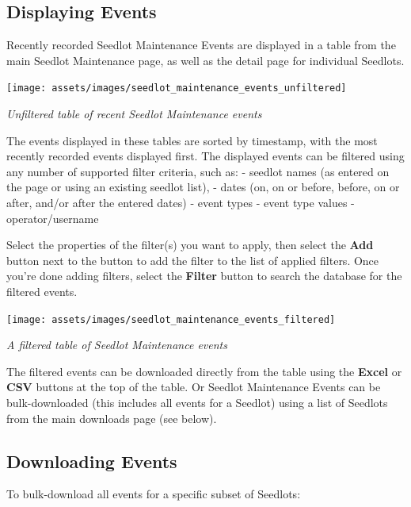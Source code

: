 \documentclass[
  12pt,
]{book}
\begin{document}
\hypertarget{displaying-events}{%
\subsection{Displaying Events}\label{displaying-events}}

Recently recorded Seedlot Maintenance Events are displayed in a table from the main Seedlot Maintenance page, as well as the detail page for individual Seedlots.

\begin{center}\texttt{[image: assets/images/seedlot\_maintenance\_events\_unfiltered]} \end{center}

\emph{Unfiltered table of recent Seedlot Maintenance events}

The events displayed in these tables are sorted by timestamp, with the most recently recorded events displayed first. The displayed events can be filtered using any number of supported filter criteria, such as: - seedlot names (as entered on the page or using an existing seedlot list), - dates (on, on or before, before, on or after, and/or after the entered dates) - event types - event type values - operator/username

Select the properties of the filter(s) you want to apply, then select the \textbf{Add} button next to the button to add the filter to the list of applied filters. Once you're done adding filters, select the \textbf{Filter} button to search the database for the filtered events.

\begin{center}\texttt{[image: assets/images/seedlot\_maintenance\_events\_filtered]} \end{center}

\emph{A filtered table of Seedlot Maintenance events}

The filtered events can be downloaded directly from the table using the \textbf{Excel} or \textbf{CSV} buttons at the top of the table. Or Seedlot Maintenance Events can be bulk-downloaded (this includes all events for a Seedlot) using a list of Seedlots from the main downloads page (see below).

\hypertarget{downloading-events}{%
\subsection{Downloading Events}\label{downloading-events}}

To bulk-download all events for a specific subset of Seedlots:
\end{document}
